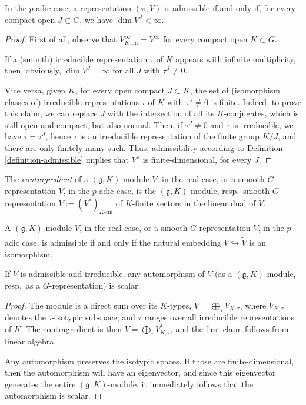 \begin{lemma}
 \label{lemma-admissible-padic}
In the $p$-adic case, a representation $(\pi, V)$ is admissible if and only if, for every compact open $J\subset G$, we have $\dim V^J <\infty$. 
\end{lemma}

\begin{proof}
 First of all, observe that $V^\infty_{K\text{-fin}} = V^\infty$ for every compact open $K\subset G$.  
 
 If a (smooth) irreducible representation $\tau$ of $K$ appears with infinite multiplicity, then, obviously, $\dim V^J = \infty$ for all $J$ with $\tau^J\ne 0$. 
 
 Vice versa, given $K$, for every open compact $J\subset K$, the set of (isomorphism classes of) irreducible representations $\tau$ of $K$ with $\tau^J\ne 0$ is finite. Indeed, to prove this claim, we can replace $J$ with the intersection of all its $K$-conjugates, which is still open and compact, but also normal. Then, if $\tau^J\ne 0$ and $\tau$ is irreducible, we have $\tau = \tau^J$, hence $\tau$ is an irreducible representation of the finite group $K/J$, and there are only finitely many such. Thus, admissibility according to Definition \ref{definition-admissible} implies that $V^J$ is finite-dimensional, for every $J$.  
\end{proof}

\begin{definition}
 \label{definition-contragredient}
The {\it contragredient} of a $(\mathfrak g,K)$-module $V$, in the real case, or a smooth $G$-representation $V$, in the $p$-adic case, is the $(\mathfrak g, K)$-module, resp.\ smooth $G$-representation $\tilde V:=(V^*)_{K\text{-fin}}$ of $K$-finite vectors in the linear dual of $V$. 
\end{definition}



\begin{lemma}
 \label{lemma-admissible-gK}
A $(\mathfrak g,K)$-module $V$, in the real case, or a smooth $G$-representation $V$, in the $p$-adic case, is admissible if and only if the natural embedding $V\hookrightarrow \tilde{\tilde V}$ is an isomorphism.

If $V$ is admissible and irreducible, any automorphism of $V$ (as a $(\mathfrak g,K)$-module, resp.\ as a $G$-representation) is scalar.
\end{lemma}

\begin{proof}
 The module is a direct sum over its $K$-types, $V = \bigoplus_\tau V_{K,\tau}$, where $V_{K,\tau}$ denotes the $\tau$-isotypic subspace, and $\tau$ ranges over all irreducible representations of $K$. The contragredient is then $\tilde V = \bigoplus_\tau V_{K,\tau}^*$, and the first claim follows from linear algebra. 
 
 Any automorphism preserves the isotypic spaces. If those are finite-dimensional, then the automorphism will have an eigenvector, and since this eigenvector generates the entire $(\mathfrak g, K)$-module, it immediately follows that the automorphism is scalar.
\end{proof}

